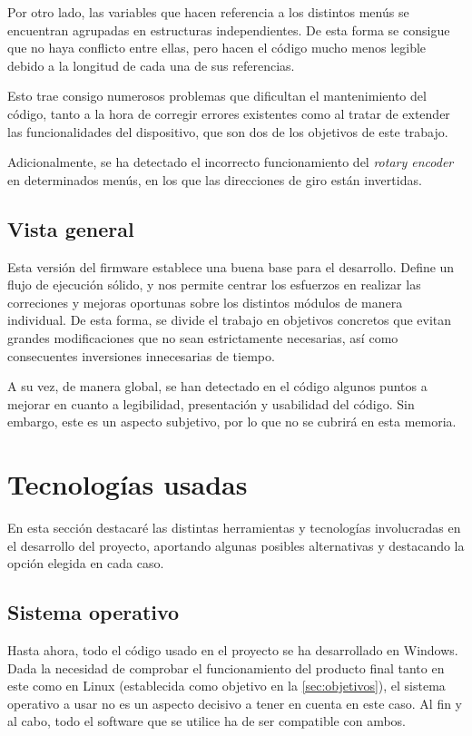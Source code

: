 Por otro lado, las variables que hacen referencia a los distintos menús se encuentran agrupadas en estructuras independientes. De esta forma se consigue que no haya conflicto entre ellas, pero hacen el código mucho menos legible debido a la longitud de cada una de sus referencias.

Esto trae consigo numerosos problemas que dificultan el mantenimiento del código, tanto a la hora de corregir errores existentes como al tratar de extender las funcionalidades del dispositivo, que son dos de los objetivos de este trabajo.

Adicionalmente, se ha detectado el incorrecto funcionamiento del \textit{rotary encoder} en determinados menús, en los que las direcciones de giro están invertidas.

\subsection{Vista general}

Esta versión del firmware establece una buena base para el desarrollo. Define un flujo de ejecución sólido, y nos permite centrar los esfuerzos en realizar las correciones y mejoras oportunas sobre los distintos módulos de manera individual. De esta forma, se divide el trabajo en objetivos concretos que evitan grandes modificaciones que no sean estrictamente necesarias, así como consecuentes inversiones innecesarias de tiempo.

A su vez, de manera global, se han detectado en el código algunos puntos a mejorar en cuanto a legibilidad, presentación y usabilidad del código. Sin embargo, este es un aspecto subjetivo, por lo que no se cubrirá en esta memoria.

\section{Tecnologías usadas}

En esta sección destacaré las distintas herramientas y tecnologías involucradas en el desarrollo del proyecto, aportando algunas posibles alternativas y destacando la opción elegida en cada caso.

\subsection{Sistema operativo}

Hasta ahora, todo el código usado en el proyecto se ha desarrollado en Windows. Dada la necesidad de comprobar el funcionamiento del producto final tanto en este como en Linux (establecida como objetivo en la \autoref{sec:objetivos}), el sistema operativo a usar no es un aspecto decisivo a tener en cuenta en este caso. Al fin y al cabo, todo el software que se utilice ha de ser compatible con ambos.

